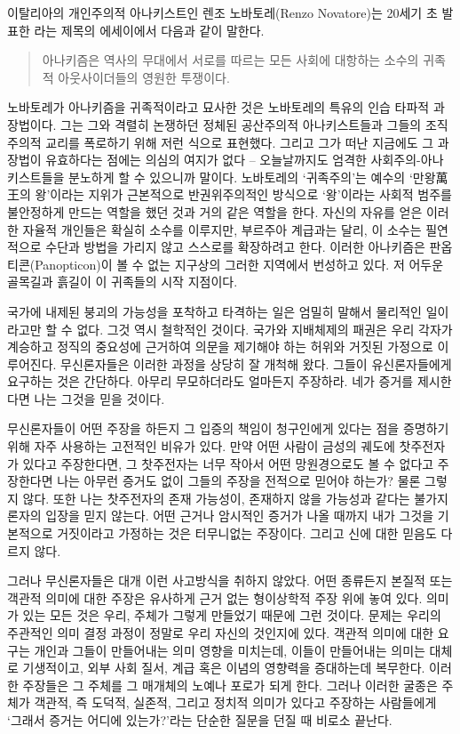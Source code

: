 \documentclass[10pt, b6paper, openany]{memoir}
\begin{document}
\begin{article}
이탈리아의 개인주의적 아나키스트인 렌조 노바토레(Renzo Novatore)는 20세기 초 발표한 \parencite{ibk:renzo2012}라는 제목의 에세이에서 다음과 같이 말한다.

\begin{quote}
아나키즘은 역사의 무대에서 서로를 따르는 모든 사회에 대항하는 소수의 귀족적 아웃사이더들의 영원한 투쟁이다.
\end{quote}

노바토레가 아나키즘을 귀족적이라고 묘사한 것은 노바토레의 특유의 인습 타파적 과장법이다. 그는 그와 격렬히 논쟁하던 정체된 공산주의적 아나키스트들과 그들의 조직주의적 교리를 폭로하기 위해 저런 식으로 표현했다. 그리고 그가 떠난 지금에도 그 과장법이 유효하다는 점에는 의심의 여지가 없다 – 오늘날까지도 엄격한 사회주의-아나키스트들을 분노하게 할 수 있으니까 말이다. 노바토레의 `귀족주의'는 예수의 `만왕萬王의 왕'이라는 지위가 근본적으로 반권위주의적인 방식으로 `왕'이라는 사회적 범주를 불안정하게 만드는 역할을 했던 것과 거의 같은 역할을 한다. 자신의 자유를 얻은 이러한 자율적 개인들은 확실히 소수를 이루지만, 부르주아 계급과는 달리, 이 소수는 필연적으로 수단과 방법을 가리지 않고 스스로를 확장하려고 한다. 이러한 아나키즘은 판옵티콘(Panopticon)이 볼 수 없는 지구상의 그러한 지역에서 번성하고 있다. 저 어두운 골목길과 흙길이 이 귀족들의 시작 지점이다.

국가에 내제된 붕괴의 가능성을 포착하고 타격하는 일은 엄밀히 말해서 물리적인 일이라고만 할 수 없다. 그것 역시 철학적인 것이다. 국가와 지배체제의 패권은 우리 각자가 계승하고 정직의 중요성에 근거하여 의문을 제기해야 하는 허위와 거짓된 가정으로 이루어진다. 무신론자들은 이러한 과정을 상당히 잘 개척해 왔다. 그들이 유신론자들에게 요구하는 것은 간단하다. 아무리 무모하더라도 얼마든지 주장하라. 네가 증거를 제시한다면 나는 그것을 믿을 것이다. 

무신론자들이 어떤 주장을 하든지 그 입증의 책임이 청구인에게 있다는 점을 증명하기 위해 자주 사용하는 고전적인 비유가 있다. 만약 어떤 사람이 금성의 궤도에 찻주전자가 있다고 주장한다면, 그 찻주전자는 너무 작아서 어떤 망원경으로도 볼 수 없다고 주장한다면 나는 아무런 증거도 없이 그들의 주장을 전적으로 믿어야 하는가? 물론 그렇지 않다. 또한 나는 찻주전자의 존재 가능성이, 존재하지 않을 가능성과 같다는 불가지론자의 입장을 믿지 않는다. 어떤 근거나 암시적인 증거가 나올 때까지 내가 그것을 기본적으로 거짓이라고 가정하는 것은 터무니없는 주장이다. 그리고 신에 대한 믿음도 다르지 않다. 

그러나 무신론자들은 대개 이런 사고방식을 취하지 않았다. 어떤 종류든지 본질적 또는 객관적 의미에 대한 주장은 유사하게 근거 없는 형이상학적 주장 위에 놓여 있다. 의미가 있는 모든 것은 우리, 주체가 그렇게 만들었기 때문에 그런 것이다. 문제는 우리의 주관적인 의미 결정 과정이 정말로 우리 자신의 것인지에 있다. 객관적 의미에 대한 요구는 개인과 그들이 만들어내는 의미 영향을 미치는데, 이들이 만들어내는 의미는 대체로 기생적이고, 외부 사회 질서, 계급 혹은 이념의 영향력을 증대하는데 복무한다. 이러한 주장들은 그 주체를 그 매개체의 노예나 포로가 되게 한다. 그러나 이러한 굴종은 주체가 객관적, 즉 도덕적, 실존적, 그리고 정치적 의미가 있다고 주장하는 사람들에게 `그래서 증거는 어디에 있는가?'라는 단순한 질문을 던질 때 비로소 끝난다.


\end{article}
\end{document}
